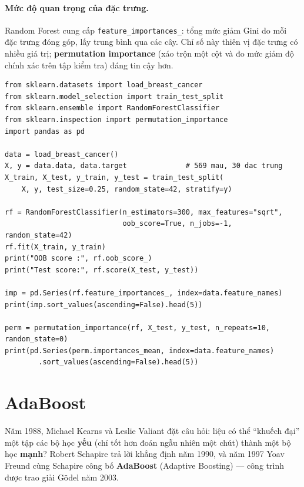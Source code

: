 \paragraph{Mức độ quan trọng của đặc trưng.} Random Forest cung cấp \texttt{feature\_importances\_}: tổng mức giảm Gini do mỗi đặc trưng đóng góp, lấy trung bình qua các cây. Chỉ số này thiên vị đặc trưng có nhiều giá trị; \textbf{permutation importance} (xáo trộn một cột và đo mức giảm độ chính xác trên tập kiểm tra) đáng tin cậy hơn.

\begin{lstlisting}[caption={Random Forest trên dữ liệu ung thư vú Wisconsin}]
from sklearn.datasets import load_breast_cancer
from sklearn.model_selection import train_test_split
from sklearn.ensemble import RandomForestClassifier
from sklearn.inspection import permutation_importance
import pandas as pd

data = load_breast_cancer()
X, y = data.data, data.target              # 569 mau, 30 dac trung
X_train, X_test, y_train, y_test = train_test_split(
    X, y, test_size=0.25, random_state=42, stratify=y)

rf = RandomForestClassifier(n_estimators=300, max_features="sqrt",
                            oob_score=True, n_jobs=-1, random_state=42)
rf.fit(X_train, y_train)
print("OOB score :", rf.oob_score_)
print("Test score:", rf.score(X_test, y_test))

imp = pd.Series(rf.feature_importances_, index=data.feature_names)
print(imp.sort_values(ascending=False).head(5))

perm = permutation_importance(rf, X_test, y_test, n_repeats=10, random_state=0)
print(pd.Series(perm.importances_mean, index=data.feature_names)
        .sort_values(ascending=False).head(5))
\end{lstlisting}


\section{AdaBoost}

Năm 1988, Michael Kearns và Leslie Valiant đặt câu hỏi: liệu có thể ``khuếch đại'' một tập các bộ học \textbf{yếu} (chỉ tốt hơn đoán ngẫu nhiên một chút) thành một bộ học \textbf{mạnh}? Robert Schapire trả lời khẳng định năm 1990, và năm 1997 Yoav Freund cùng Schapire công bố \textbf{AdaBoost} (Adaptive Boosting) --- công trình được trao giải Gödel năm 2003.

